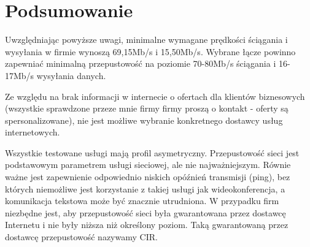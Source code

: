 \documentclass[12pt,a4paper,titlepage]{article}
\begin{document}
\section{Podsumowanie}

Uwzględniając powyższe uwagi, minimalne wymagane prędkości ściągania i wysyłania w firmie wynoszą 69,15Mb/s i 15,50Mb/s. Wybrane łącze powinno zapewniać minimalną przepustowość na poziomie 70-80Mb/s ściągania i 16-17Mb/s wysyłania danych.

\vspace{0.5cm}
Ze względu na brak informacji w internecie o ofertach dla klientów biznesowych (wszystkie sprawdzone przeze mnie firmy firmy proszą o kontakt - oferty są spersonalizowane), nie jest możliwe wybranie konkretnego dostawcy usług internetowych.

\vspace{0.5cm}
Wszystkie testowane usługi mają profil asymetryczny. Przepustowość sieci jest podstawowym parametrem usługi sieciowej, ale nie najważniejszym. Równie ważne jest zapewnienie odpowiednio niskich opóźnień transmisji (ping), bez których niemożliwe jest korzystanie z takiej usługi jak wideokonferencja, a komunikacja tekstowa może być znacznie utrudniona. W przypadku firm niezbędne jest, aby przepustowość sieci była gwarantowana przez dostawcę Internetu i nie były niższa niż określony poziom. Taką gwarantowaną przez dostawcę przepustowość nazywamy CIR.
\end{document}
